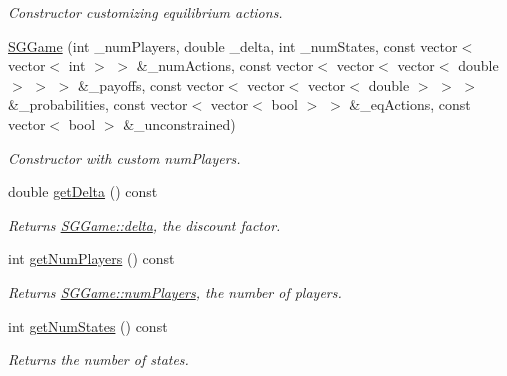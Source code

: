 \begin{DoxyCompactItemize}
\begin{DoxyCompactList}\small\item\em Constructor customizing equilibrium actions. \end{DoxyCompactList}\item 
\hyperlink{classSGGame_af6715eb62a0133849bbe9fe60fe113ab}{S\+G\+Game} (int \+\_\+num\+Players, double \+\_\+delta, int \+\_\+num\+States, const vector$<$ vector$<$ int $>$ $>$ \&\+\_\+num\+Actions, const vector$<$ vector$<$ vector$<$ double $>$ $>$ $>$ \&\+\_\+payoffs, const vector$<$ vector$<$ vector$<$ double $>$ $>$ $>$ \&\+\_\+probabilities, const vector$<$ vector$<$ bool $>$ $>$ \&\+\_\+eq\+Actions, const vector$<$ bool $>$ \&\+\_\+unconstrained)
\begin{DoxyCompactList}\small\item\em Constructor with custom num\+Players. \end{DoxyCompactList}\item 
\mbox{\label{classSGGame_aefa61117ee6c117c297791f976b36324}} 
double \hyperlink{classSGGame_aefa61117ee6c117c297791f976b36324}{get\+Delta} () const
\begin{DoxyCompactList}\small\item\em Returns \hyperlink{classSGGame_a5031fc31f8009c19901c0930224e0465}{S\+G\+Game\+::delta}, the discount factor. \end{DoxyCompactList}\item 
\mbox{\label{classSGGame_aaecc5512e85b0c360d4c462d3f84eae0}} 
int \hyperlink{classSGGame_aaecc5512e85b0c360d4c462d3f84eae0}{get\+Num\+Players} () const
\begin{DoxyCompactList}\small\item\em Returns \hyperlink{classSGGame_a6f02e3f92db6a3c5d2d9076dcb7b6d61}{S\+G\+Game\+::num\+Players}, the number of players. \end{DoxyCompactList}\item 
\mbox{\label{classSGGame_a1cbb93f4557f71df9d7bffcfeb8ff51c}} 
int \hyperlink{classSGGame_a1cbb93f4557f71df9d7bffcfeb8ff51c}{get\+Num\+States} () const
\begin{DoxyCompactList}\small\item\em Returns the number of states. \end{DoxyCompactList}\item 
\mbox{\label{classSGGame_acfd5f0817645a9adf9474552aca4f62e}} 

\end{DoxyCompactItemize}
